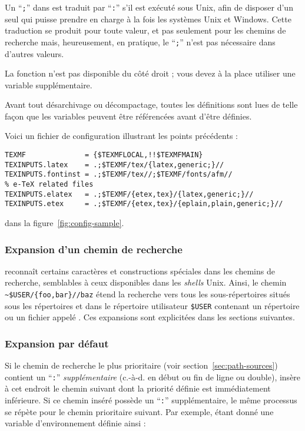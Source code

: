 \documentclass[german, english, french, 12pt]{article}
\renewcommand{\samp}[1]{\enquote{\texttt{#1}}}
\begin{document}
\begin{itemize*}
  Un \samp{;} dans  est traduit par \samp{:} s'il est exécuté sous
  Unix, afin de disposer d'un seul  qui puisse prendre en charge
  à la fois les systèmes Unix et Windows. Cette traduction se produit pour toute
  valeur, et pas seulement pour les chemins de recherche mais, heureusement, en
  pratique, le \samp{;} n'est pas nécessaire dans d'autres valeurs.

  La fonction  n'est pas disponible du côté droit ;
  vous devez à la place utiliser une variable supplémentaire.
\item Avant tout désarchivage ou décompactage, toutes les définitions sont lues
  de telle façon que les variables peuvent être référencées avant d'être
  définies.
\end{itemize*}
Voici un fichier de configuration illustrant les points précédents :
\ifSingleColumn

\begin{verbatim}
TEXMF              = {$TEXMFLOCAL,!!$TEXMFMAIN}
TEXINPUTS.latex    = .;$TEXMF/tex/{latex,generic;}//
TEXINPUTS.fontinst = .;$TEXMF/tex//;$TEXMF/fonts/afm//
% e-TeX related files
TEXINPUTS.elatex   = .;$TEXMF/{etex,tex}/{latex,generic;}//
TEXINPUTS.etex     = .;$TEXMF/{etex,tex}/{eplain,plain,generic;}//
\end{verbatim}

\else dans la figure~\ref{fig:config-sample}.  \fi

\subsubsection{Expansion d'un chemin de recherche}
\label{sec:path-expansion}

\KPS{} reconnaît certains caractères et constructions spéciales dans les chemins
de recherche, semblables à ceux disponibles dans les \textit{shells}
Unix. Ainsi, le chemin \verb+~$USER/{foo,bar}//baz+ %
étend la recherche vers tous les sous-répertoires situés sous les répertoires
 et  dans le répertoire utilisateur \texttt{\$USER}
contenant un répertoire ou un fichier appelé %
. Ces expansions sont explicitées dans les sections suivantes.

\subsubsection{Expansion par défaut}
\label{sec:default-expansion}

Si le chemin de recherche le plus prioritaire (voir
section~\ref{sec:path-sources}) contient un \samp{:} \emph{supplémentaire}
(\mbox{c.-à-d.} en début ou fin de ligne ou double), \KPS{} insère à cet endroit
le chemin suivant dont la priorité définie est immédiatement inférieure. Si ce
chemin inséré possède un \samp{:} supplémentaire, le même processus se répète
pour le chemin prioritaire suivant.  Par exemple, étant donné une variable
d'environnement définie ainsi :
\end{document}

